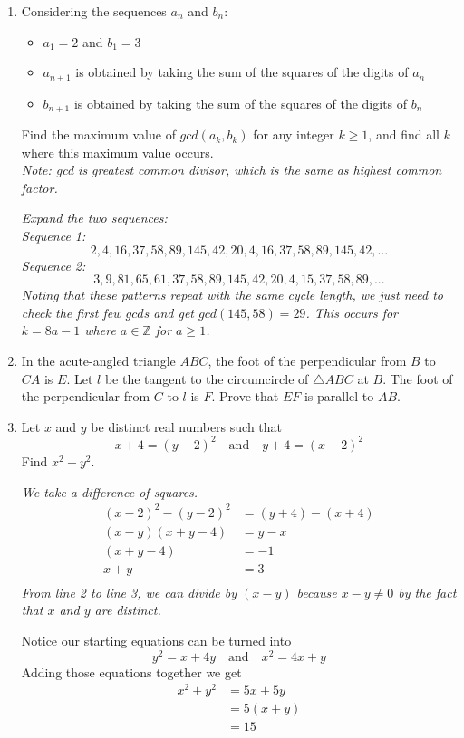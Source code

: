 \documentclass{article}
\begin{document}
\begin{enumerate}[1.]
\item %
Considering the sequences $a_n$ and $b_n$:
\begin{itemize}
\item $a_1=2$ and $b_1=3$
\item $a_{n+1}$ is obtained by taking the sum of the squares of the digits of $a_{n}$
\item $b_{n+1}$ is obtained by taking the sum of the squares of the digits of $b_n$
\end{itemize}
Find the maximum value of $gcd(a_k,b_k)$ for any integer $k\geq 1$, and find all $k$ where this maximum value occurs.\\
\textit{Note: gcd is greatest common divisor, which is the same as highest common factor.}

{\itshape Expand the two sequences:\\
Sequence 1: $$2,4,16,37,58,89,145,42,20,4,16,37,58,89,145,42,...$$ Sequence 2: $$3,9,81,65,61,37,58,89,145,42,20,4,15,37,58,89,...$$ Noting that these patterns repeat with the same cycle length, we just need to check the first few $gcd$s and get $gcd(145,58)=29$. This occurs for $k=8a-1$ where $a\in \mathbb{Z}$ for $a\geq 1$.}


\item %
In the acute-angled triangle $ABC$, the foot of the perpendicular from $B$ to $CA$ is $E$. Let $l$ be the tangent to the circumcircle of $\triangle ABC$ at $B$. The foot of the perpendicular from $C$ to $l$ is $F$. Prove that $EF$ is parallel to $AB$.


\item %
Let $x$ and $y$ be distinct real numbers such that $$x + 4 = (y - 2)^2 \quad\text{and}\quad y + 4 = (x - 2)^2$$
Find $x^2 + y^2$.

{\itshape We take a difference of squares.
\begin{align*}
(x - 2)^2 - (y - 2)^2 &= (y + 4) - (x + 4)\\
(x - y)(x + y - 4) &= y - x\\
(x + y - 4) &= -1\\
x + y &= 3\\
\end{align*}
From line 2 to line 3, we can divide by $(x - y)$ because $x - y \neq 0$ by the fact that $x$ and $y$ are distinct.

Notice our starting equations can be turned into $$y^2 = x + 4y \quad \text{and}\quad x^2 = 4x + y$$ Adding those equations together we get
\begin{align*}
x^2 + y^2 &= 5x + 5y\\
&= 5(x + y)\\
&=15
\end{align*}}


\end{enumerate}
\end{document}
